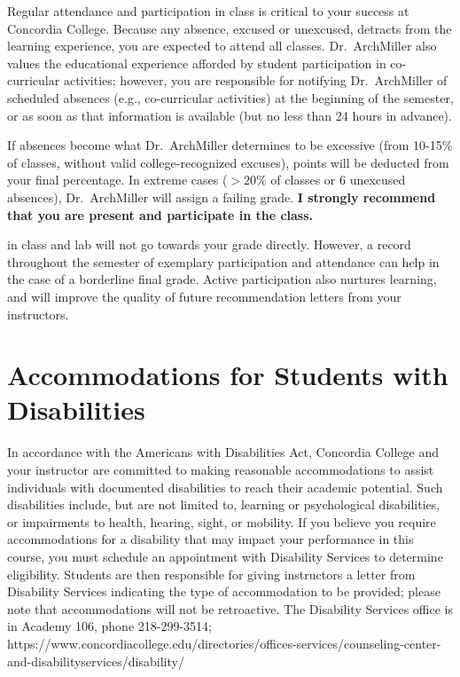 \documentclass{tufte-handout}
\begin{document}
\begin{fullwidth}
Regular attendance and participation in class is critical to your success at Concordia College. Because any absence, excused or unexcused, detracts from the learning experience, you are expected to attend all classes. Dr.~ArchMiller also values the educational experience afforded by student participation in co-curricular activities; however, you are responsible for notifying Dr.~ArchMiller of scheduled absences (e.g., co-curricular activities) at the beginning of the semester, or as soon as that information is available (but no less than 24 hours in advance). 

If absences become what Dr.~ArchMiller determines to be excessive (from 10-15\% of classes, without valid college-recognized excuses), points will be deducted from your final percentage. In extreme cases ($>20$\% of classes or 6 unexcused absences), Dr.~ArchMiller will assign a failing grade. \textbf{I strongly recommend that you are present and participate in the class.}

 in class and lab will not go towards your grade directly. However, a record throughout the semester of exemplary participation and attendance can help in the case of a borderline final grade. Active participation also nurtures learning, and will improve the quality of future recommendation letters from your instructors.  

\section{Accommodations for Students with Disabilities}

In accordance with the Americans with Disabilities Act, Concordia College and your instructor are committed to making reasonable accommodations to assist individuals with documented disabilities to reach their academic potential. Such disabilities include, but are not limited to, learning or psychological disabilities, or impairments to health, hearing, sight, or mobility. If you believe you require accommodations for a disability that may impact your performance in this course, you must schedule an appointment with Disability Services to determine eligibility. Students are then responsible for giving instructors a letter from Disability Services indicating the type of accommodation to be provided; please note that accommodations will not be retroactive. The Disability Services office is in Academy 106, phone 218-299-3514; https://www.concordiacollege.edu/directories/offices-services/counseling-center-and-disabilityservices/disability/ 


\end{fullwidth}
\end{document}
